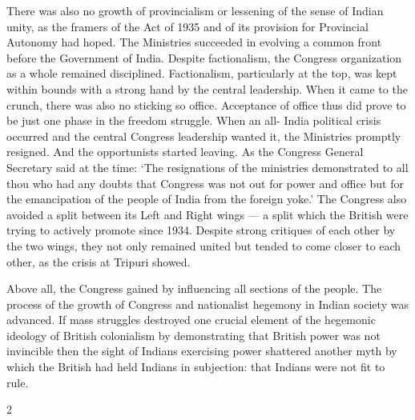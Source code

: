 \begin{multicols}{2}
There was also no growth of provincialism or lessening of the sense of Indian unity, as the framers of the Act of 1935 and of its provision for Provincial Autonomy had hoped. The Ministries succeeded in evolving a common front before the Government of India. Despite factionalism, the Congress organization as a whole remained disciplined. Factionalism, particularly at the top, was kept within bounds with a strong hand by the central leadership. When it came to the crunch, there was also no sticking so office. Acceptance of office thus did prove to be just one phase in the freedom struggle. When an all- India political crisis occurred and the central Congress leadership wanted it, the Ministries promptly resigned. And the opportunists started leaving. As the Congress General Secretary said at the time: `The resignations of the ministries demonstrated to all thou who had any doubts that Congress was not out for power and office but for the emancipation of the people of India from the foreign yoke.' The Congress also avoided a split between its Left and Right wings --- a split which the British were trying to actively promote since 1934. Despite strong critiques of each other by the two wings, they not only remained united but tended to come closer to each other, as the crisis at Tripuri showed. 

Above all, the Congress gained by influencing all sections of the people. The process of the growth of Congress and nationalist hegemony in Indian society was advanced. If mass struggles destroyed one crucial element of the hegemonic ideology of British colonialism by demonstrating that British power was not invincible then the sight of Indians exercising power shattered another myth by which the British had held Indians in subjection: that Indians were not fit to rule.
\end{multicols}{2}
